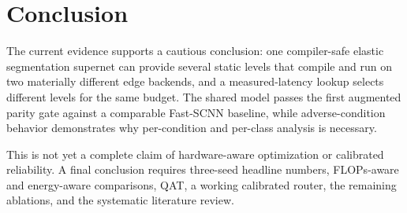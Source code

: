 \section{Conclusion}
\label{sec:conclusion}

The current evidence supports a cautious conclusion: one compiler-safe elastic segmentation supernet can provide several static levels that compile and run on two materially different edge backends, and a measured-latency lookup selects different levels for the same budget. The shared model passes the first augmented parity gate against a comparable Fast-SCNN baseline, while adverse-condition behavior demonstrates why per-condition and per-class analysis is necessary.

This is not yet a complete claim of hardware-aware optimization or calibrated reliability. A final conclusion requires three-seed headline numbers, FLOPs-aware and energy-aware comparisons, QAT, a working calibrated router, the remaining ablations, and the systematic literature review.

